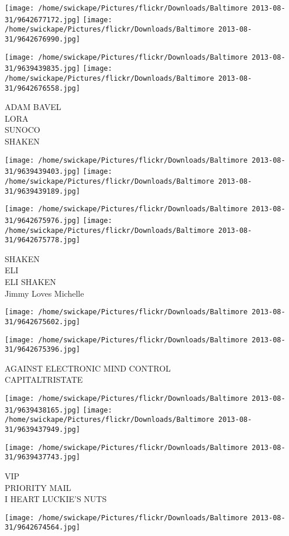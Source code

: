 \documentclass[10pt,letterpaper]{article}
\begin{document}
\texttt{[image: /home/swickape/Pictures/flickr/Downloads/Baltimore 2013-08-31/9642677172.jpg]}
\texttt{[image: /home/swickape/Pictures/flickr/Downloads/Baltimore 2013-08-31/9642676990.jpg]}

\texttt{[image: /home/swickape/Pictures/flickr/Downloads/Baltimore 2013-08-31/9639439835.jpg]}
\texttt{[image: /home/swickape/Pictures/flickr/Downloads/Baltimore 2013-08-31/9642676558.jpg]}

ADAM BAVEL\\
LORA\\
SUNOCO\\
SHAKEN
\pagebreak

\texttt{[image: /home/swickape/Pictures/flickr/Downloads/Baltimore 2013-08-31/9639439403.jpg]}
\texttt{[image: /home/swickape/Pictures/flickr/Downloads/Baltimore 2013-08-31/9639439189.jpg]}

\texttt{[image: /home/swickape/Pictures/flickr/Downloads/Baltimore 2013-08-31/9642675976.jpg]}
\texttt{[image: /home/swickape/Pictures/flickr/Downloads/Baltimore 2013-08-31/9642675778.jpg]}

SHAKEN\\
ELI\\
ELI SHAKEN\\
Jimmy Loves Michelle
\pagebreak

\texttt{[image: /home/swickape/Pictures/flickr/Downloads/Baltimore 2013-08-31/9642675602.jpg]}

\vspace{0.25in}
\texttt{[image: /home/swickape/Pictures/flickr/Downloads/Baltimore 2013-08-31/9642675396.jpg]}

AGAINST ELECTRONIC MIND CONTROL\\
CAPITALTRISTATE
\pagebreak

\texttt{[image: /home/swickape/Pictures/flickr/Downloads/Baltimore 2013-08-31/9639438165.jpg]}
\texttt{[image: /home/swickape/Pictures/flickr/Downloads/Baltimore 2013-08-31/9639437949.jpg]}

\texttt{[image: /home/swickape/Pictures/flickr/Downloads/Baltimore 2013-08-31/9639437743.jpg]}

VIP\\
PRIORITY MAIL\\
I HEART LUCKIE'S NUTS
\pagebreak

\texttt{[image: /home/swickape/Pictures/flickr/Downloads/Baltimore 2013-08-31/9642674564.jpg]}
\end{document}
